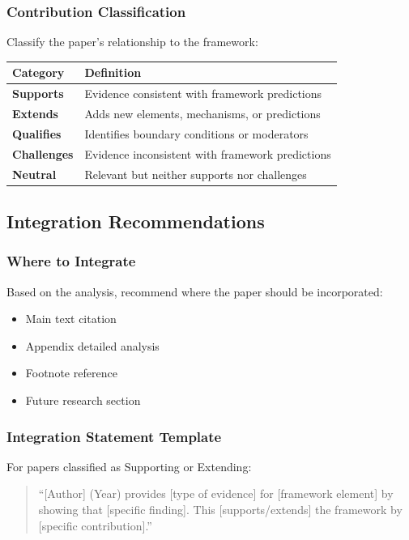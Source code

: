 \subsubsection{Contribution Classification}

Classify the paper's relationship to the framework:

\begin{center}
\renewcommand{\arraystretch}{1.2}
\begin{tabular}{lp{9cm}}
\hline
\textbf{Category} & \textbf{Definition} \\
\hline
\textbf{Supports} & Evidence consistent with framework predictions \\
\textbf{Extends} & Adds new elements, mechanisms, or predictions \\
\textbf{Qualifies} & Identifies boundary conditions or moderators \\
\textbf{Challenges} & Evidence inconsistent with framework predictions \\
\textbf{Neutral} & Relevant but neither supports nor challenges \\
\hline
\end{tabular}
\end{center}

\subsection{Integration Recommendations}

\subsubsection{Where to Integrate}

Based on the analysis, recommend where the paper should be incorporated:
\begin{itemize}
  \item Main text citation
  \item Appendix detailed analysis
  \item Footnote reference
  \item Future research section
\end{itemize}

\subsubsection{Integration Statement Template}

For papers classified as Supporting or Extending:
\begin{quote}
``[Author] (Year) provides [type of evidence] for [framework element] by showing that 
[specific finding]. This [supports/extends] the framework by [specific contribution].''
\end{quote}

